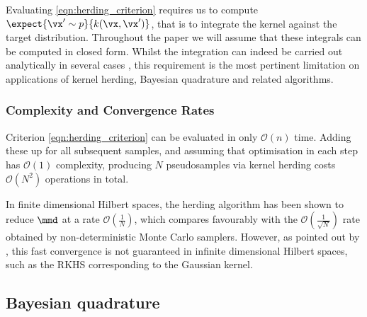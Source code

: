 Evaluating \eqref{eqn:herding_criterion} requires us to compute $\expect{\vx' \sim p}{k(\vx, \vx')} $, that is to integrate the kernel against the target distribution. Throughout the paper we will assume that these integrals can be computed in closed form. Whilst the integration can indeed be carried out analytically in several cases \citep{Song2008,chen2010super}, this requirement is the most pertinent limitation on applications of kernel herding, Bayesian quadrature and related algorithms.

\subsubsection{Complexity and Convergence Rates}

Criterion \eqref{eqn:herding_criterion} can be evaluated in only $\mathcal{O}(n)$ time. Adding these up for all subsequent samples, and assuming that optimisation in each step has $\mathcal{O}(1)$ complexity, producing $N$ pseudosamples via kernel herding costs $\mathcal{O}(N^2)$ operations in total.

In finite dimensional Hilbert spaces, the herding algorithm has been shown to reduce $\mmd$ at a rate $\mathcal{O}(\frac{1}{N})$, which compares favourably with the $\mathcal{O}(\frac{1}{\sqrt{N}})$ rate obtained by non-deterministic Monte Carlo samplers. However, as pointed out by \citep{bach2012equivalence}, this fast convergence is not guaranteed in infinite dimensional Hilbert spaces, such as the RKHS corresponding to the Gaussian kernel.


\subsection{Bayesian quadrature} 

